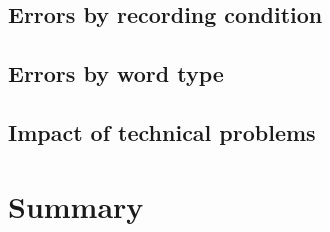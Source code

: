 		
		\subsection{Errors by recording condition}
		\label{sec:results:condition}
			\TODO{}
		
		
		\subsection{Errors by word type}
		\label{sec:results:wordtype}
			\TODO{}
	
		\subsection{Impact of technical problems}
		\label{sec:results:techproblems}
			\TODO{}
	
	
	\section{Summary}
	\label{sec:lexstress:summary}
	\TODO{}